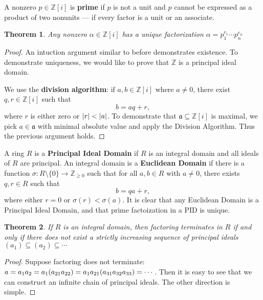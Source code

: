 \documentclass[11pt]{article}
\newtheorem{theorem}{Theorem}
\begin{document}
A nonzero $p \in \mathbb{Z}[i]$ is \textbf{prime} if $p$ is not a unit and $p$ cannot be expressed as a product of two nonunits --- if every factor is a unit or an associate.

\begin{adjustwidth}{0.5cm}{}
  \begin{theorem}
    Any nonzero $\alpha \in \mathbb{Z}[i]$ has a unique factorization $\alpha = p_{1}^{e_{1}} \cdots p_{n}^{e_{n}}$
  \end{theorem}
  \begin{proof}
    An intuction argument similar to before demonstrates existence. To demonstrate uniqueness, we would like to prove that $\mathbb{Z}$ is a principal ideal domain.

    We use the \textbf{division algorithm}: if $a, b \in \mathbb{Z}[i]$ where $a \ne 0$, there exist $q, r \in \mathbb{Z}[i]$ such that
    \[
      b = aq + r,
    \]
    where $r$ is either zero or $\abs{r} < \abs{a}$. To demonstrate that $\mathfrak{a} \subseteq \mathbb{Z}[i]$ is maximal, we pick $a \in \mathfrak{a}$ with minimal absolute value and apply the Division Algorithm. Thus the previous argument holds.
  \end{proof}
\end{adjustwidth}

A ring $R$ is a \textbf{Principal Ideal Domain} if $R$ is an integral domain and all ideals of $R$ are principal. An integral domain is a \textbf{Euclidean Domain} if there is a function $\sigma : R \setminus \{ 0 \} \to \mathbb{Z}_{\ge 0}$ such that for all $a, b \in R$ with $a \ne 0$, there exists $q, r \in R$ such that
\[
  b = qa + r,
\]
where either $r = 0$ or $\sigma(r) < \sigma(a)$. It is clear that any Euclidean Domain is a Principal Ideal Domain, and that prime factoization in a PID is unique.

\begin{adjustwidth}{0.5cm}{}
  \begin{theorem}
    If $R$ is an integral domain, then factoring terminates in $R$ if and only if there does not exist a strictly increasing sequence of principal ideals $(a_{1}) \subseteq (a_{2}) \subseteq \cdots$
  \end{theorem}
  \begin{proof}
    Suppose factoring does not terminate: $a = a_{1}a_{2} = a_{1}(a_{21}a_{22}) = \\ a_{1}a_{21}(a_{31}a_{32}a_{33}) = \cdots$. Then it is easy to see that we can construct an infinite chain of principal ideals. The other direction is simple.
  \end{proof}
\end{adjustwidth}
\end{document}

